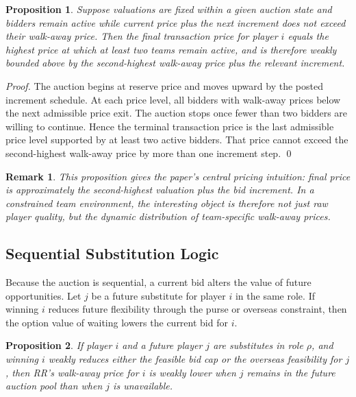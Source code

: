 \documentclass[11pt]{article}
\newtheorem{proposition}{Proposition}
\newtheorem{remark}{Remark}
\begin{document}
\begin{proposition}
Suppose valuations are fixed within a given auction state and bidders remain active while current price plus the next increment does not exceed their walk-away price. Then the final transaction price for player \(i\) equals the highest price at which at least two teams remain active, and is therefore weakly bounded above by the second-highest walk-away price plus the relevant increment.
\end{proposition}

\begin{proof}
The auction begins at reserve price and moves upward by the posted increment schedule. At each price level, all bidders with walk-away prices below the next admissible price exit. The auction stops once fewer than two bidders are willing to continue. Hence the terminal transaction price is the last admissible price level supported by at least two active bidders. That price cannot exceed the second-highest walk-away price by more than one increment step. \qed
\end{proof}

\begin{remark}
This proposition gives the paper's central pricing intuition: final price is approximately the second-highest valuation plus the bid increment. In a constrained team environment, the interesting object is therefore not just raw player quality, but the dynamic distribution of team-specific walk-away prices.
\end{remark}

\subsection{Sequential Substitution Logic}

Because the auction is sequential, a current bid alters the value of future opportunities. Let \(j\) be a future substitute for player \(i\) in the same role. If winning \(i\) reduces future flexibility through the purse or overseas constraint, then the option value of waiting lowers the current bid for \(i\).

\begin{proposition}
If player \(i\) and a future player \(j\) are substitutes in role \(\rho\), and winning \(i\) weakly reduces either the feasible bid cap or the overseas feasibility for \(j\), then RR's walk-away price for \(i\) is weakly lower when \(j\) remains in the future auction pool than when \(j\) is unavailable.
\end{proposition}
\end{document}
